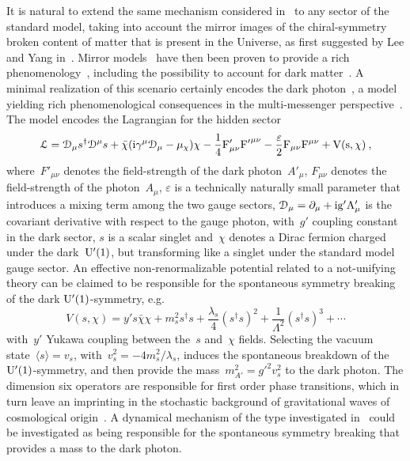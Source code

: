 \documentclass[reqno,11pt]{amsart}
\numberwithin{equation}{section}
\newcommand{\1}{\mbox{\rm 1 \hspace{-1.05 em} 1}}
\newcommand{\U}{{\rm{U}}}
\renewcommand{\imath}{\rm{i}}
\newcommand\Felix[1]{}
\begin{document}
\begin{enumerate}[leftmargin=2em]
It is natural to extend the same mechanism considered in~\cite{Senjanovic:1975rk} to any sector of the standard model, taking into account the mirror images of the chiral-symmetry broken content of matter that is present in the Universe, as first suggested by Lee and Yang in~\cite{Lee:1956qn}. Mirror models~\cite{MDM1,MDM2,MDM3, MDM4,MDM5,MDM6,MDM7,MDM8} have then been proven to provide a rich phenomenology~\cite{MDMP1,MDMP2,MDMP3}, including the possibility to account for dark matter~\cite{MDMPDM1,MDMPDM2}. A minimal realization of this scenario certainly encodes the dark photon~\cite{dpA,dpB,dpC}, a model yielding rich phenomenological consequences in the multi-messenger perspective~\cite{dp18}. The model encodes the Lagrangian for the hidden sector  
\[ \mathcal{L}=\mathcal{D}_\mu s^\dagger \mathcal{D}^\mu s + \bar{\chi} (\imath \gamma^\mu \mathcal{D}_\mu - \mu_\chi ) \chi -\frac{1}{4} F'_{\mu \nu} {F'}^{\mu \nu}  -\frac{\varepsilon}{2} F_{\mu \nu} {F}^{\mu \nu} + V(s,\chi) \:, \]
where~$F'_{\mu\nu}$ denotes the field-strength of the dark photon~${A'}_\mu$, $F_{\mu\nu}$ denotes the field-strength of the photon~$A_\mu$, $\varepsilon$ is a technically naturally small parameter that introduces a mixing term among the two gauge sectors, $\mathcal{D}_\mu =\partial_\mu + \imath g' A'_\mu$ is the covariant derivative 
\Felix{Should this better be $\mathcal{D}_\mu =\partial_\mu + \imath g' A'_\mu + \imath g A_\mu$?}%
with respect to the gauge photon, with~$g'$ coupling constant in the dark sector, $s$ is a scalar singlet and~$\chi$ 
denotes a Dirac fermion charged under the dark~$\U'(1)$, but transforming like a singlet under the standard model gauge sector. An effective non-renormalizable potential related to a not-unifying theory can be claimed to be responsible for the spontaneous symmetry breaking of the dark $\U'(1)$-symmetry, e.g. 
\[ V(s,\chi)= y' s \bar{\chi}\chi + m_s^2 s^\dagger s + \frac{\lambda_s}{4} (s^\dagger s)^2 + \frac{1}{\Lambda^2} (s^\dagger s)^3 +\cdots \]
with~$y'$ Yukawa coupling between the~$s$ and~$\chi$ fields. Selecting the vacuum state~$\langle s \rangle=v_s$, with~$v_s^2=- 4 m_s^2/\lambda_s$, induces the spontaneous breakdown of the $\U'(1)$-symmetry, and then provide the mass~$m_{A'}^2={g'}^2 v_s^2$ to the dark photon. The dimension six operators are responsible for first order phase transitions, which in turn leave an imprinting in the stochastic background of gravitational waves of cosmological origin~\cite{dp18}. A dynamical mechanism of the type investigated in~\cite{Senjanovic:1975rk} could be investigated as being responsible for the spontaneous symmetry breaking that provides a mass to the dark photon.


\end{enumerate}
\end{document}
